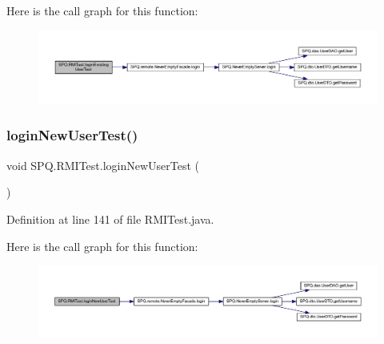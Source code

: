 Here is the call graph for this function\+:
\nopagebreak
\begin{figure}[H]
\begin{center}
\leavevmode
\includegraphics[width=350pt]{class_s_p_q_1_1_r_m_i_test_a0e9430910652b8ebeb99d2e871476ff1_cgraph}
\end{center}
\end{figure}
\mbox{\label{class_s_p_q_1_1_r_m_i_test_a07409afe054b3fd3ee0481236e45b680}} 
\subsubsection{\texorpdfstring{login\+New\+User\+Test()}{loginNewUserTest()}}
{\footnotesize\ttfamily void S\+P\+Q.\+R\+M\+I\+Test.\+login\+New\+User\+Test (\begin{DoxyParamCaption}{ }\end{DoxyParamCaption})}



Definition at line 141 of file R\+M\+I\+Test.\+java.

Here is the call graph for this function\+:
\nopagebreak
\begin{figure}[H]
\begin{center}
\leavevmode
\includegraphics[width=350pt]{class_s_p_q_1_1_r_m_i_test_a07409afe054b3fd3ee0481236e45b680_cgraph}
\end{center}
\end{figure}
\mbox{\label{class_s_p_q_1_1_r_m_i_test_aebfcce491b9fa13cafa971bac73f88b8}} 
